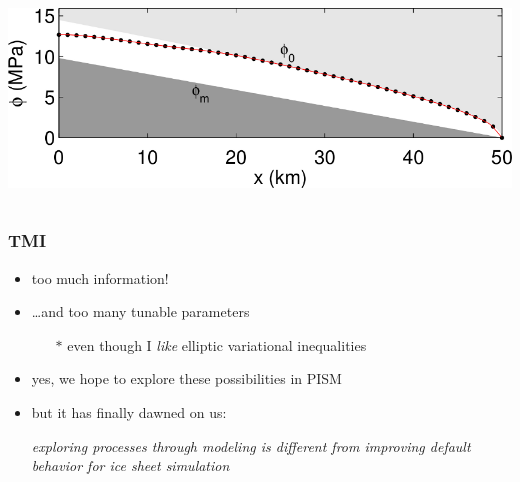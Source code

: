 \documentclass[hide notes,intlimits]{beamer}
\begin{document}
\begin{frame}
\begin{columns}
\begin{column}{0.4\textwidth}
\begin{center}
\vspace{20mm}

\includegraphics[width=1.0\textwidth]{figs/schoof-overburden}
\end{center}
\end{column}
\end{columns}

\end{frame}


\begin{frame}
  \frametitle{TMI}

  \begin{itemize}
  \item too much information!
  \item \dots and too many tunable parameters
    \begin{itemize}
    \item[$\ast$] even though I \emph{like} elliptic variational inequalities
    \end{itemize}
  \item yes, we hope to explore these possibilities in PISM
  \item but it has finally dawned on us:
  
  \begin{center}
  \emph{exploring processes through modeling is different from improving default behavior for ice sheet simulation}
  \end{center}
  \end{itemize}
\end{frame}
\end{document}
